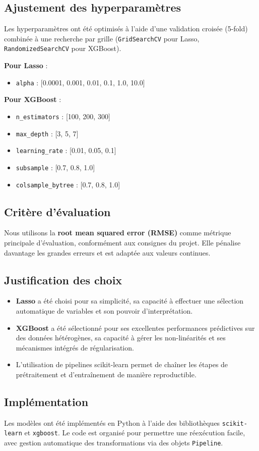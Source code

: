 \subsection*{Ajustement des hyperparamètres}

Les hyperparamètres ont été optimisés à l’aide d’une validation croisée (5-fold) combinée à une recherche par grille (\texttt{GridSearchCV} pour Lasso, \texttt{RandomizedSearchCV} pour XGBoost).

\textbf{Pour Lasso} :
\begin{itemize}
  \item \texttt{alpha} : [0.0001, 0.001, 0.01, 0.1, 1.0, 10.0]
\end{itemize}

\textbf{Pour XGBoost} :
\begin{itemize}
  \item \texttt{n\_estimators} : [100, 200, 300]
  \item \texttt{max\_depth} : [3, 5, 7]
  \item \texttt{learning\_rate} : [0.01, 0.05, 0.1]
  \item \texttt{subsample} : [0.7, 0.8, 1.0]
  \item \texttt{colsample\_bytree} : [0.7, 0.8, 1.0]
\end{itemize}

\subsection*{Critère d’évaluation}

Nous utilisons la \textbf{root mean squared error (RMSE)} comme métrique principale d’évaluation, conformément aux consignes du projet. Elle pénalise davantage les grandes erreurs et est adaptée aux valeurs continues.

\subsection*{Justification des choix}

\begin{itemize}
  \item \textbf{Lasso} a été choisi pour sa simplicité, sa capacité à effectuer une sélection automatique de variables et son pouvoir d’interprétation.
  \item \textbf{XGBoost} a été sélectionné pour ses excellentes performances prédictives sur des données hétérogènes, sa capacité à gérer les non-linéarités et ses mécanismes intégrés de régularisation.
  \item L’utilisation de pipelines scikit-learn permet de chaîner les étapes de prétraitement et d’entraînement de manière reproductible.
\end{itemize}

\subsection*{Implémentation}

Les modèles ont été implémentés en Python à l’aide des bibliothèques \texttt{scikit-learn} et \texttt{xgboost}. Le code est organisé pour permettre une réexécution facile, avec gestion automatique des transformations via des objets \texttt{Pipeline}.




